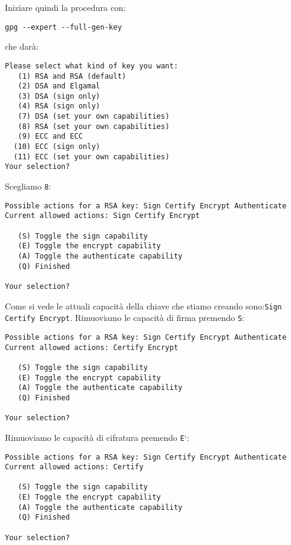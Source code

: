 \documentclass[a4paper,10pt]{article}
\begin{document}
Iniziare quindi la procedura con:

\begin{lstlisting}
gpg --expert --full-gen-key
\end{lstlisting}

che darà:

\begin{lstlisting}
Please select what kind of key you want:
   (1) RSA and RSA (default)
   (2) DSA and Elgamal
   (3) DSA (sign only)
   (4) RSA (sign only)
   (7) DSA (set your own capabilities)
   (8) RSA (set your own capabilities)
   (9) ECC and ECC
  (10) ECC (sign only)
  (11) ECC (set your own capabilities)
Your selection?
\end{lstlisting}

Scegliamo \texttt{8}:

\begin{lstlisting}
Possible actions for a RSA key: Sign Certify Encrypt Authenticate
Current allowed actions: Sign Certify Encrypt

   (S) Toggle the sign capability
   (E) Toggle the encrypt capability
   (A) Toggle the authenticate capability
   (Q) Finished

Your selection?
\end{lstlisting}

Come si vede le attuali capacità della chiave che stiamo creando sono:\newline \texttt{Sign Certify Encrypt}. Rimuoviamo le capacità di firma premendo \texttt{S}:

\begin{lstlisting}
Possible actions for a RSA key: Sign Certify Encrypt Authenticate
Current allowed actions: Certify Encrypt

   (S) Toggle the sign capability
   (E) Toggle the encrypt capability
   (A) Toggle the authenticate capability
   (Q) Finished

Your selection?
\end{lstlisting}

Rimuoviamo le capacità di cifratura premendo \texttt{E}`:

\begin{lstlisting}
Possible actions for a RSA key: Sign Certify Encrypt Authenticate
Current allowed actions: Certify

   (S) Toggle the sign capability
   (E) Toggle the encrypt capability
   (A) Toggle the authenticate capability
   (Q) Finished

Your selection?
\end{lstlisting}
\end{document}
